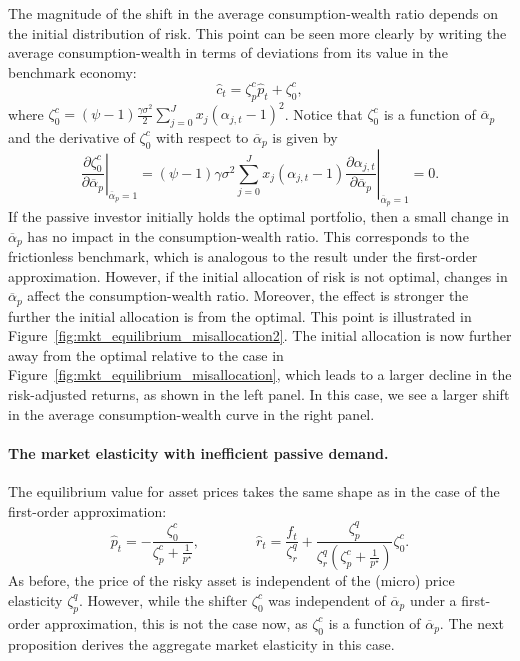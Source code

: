 The magnitude of the shift in the average consumption-wealth ratio depends on the initial distribution of risk. 
This point can be seen more clearly by writing the average consumption-wealth in terms of deviations from its value in the benchmark economy:
\begin{equation}
    \hat{c}_{t} = \zeta_{p}^c \hat{p}_t + \zeta_{0}^c,
\end{equation}
where $\zeta_0^c = (\psi-1) \frac{\gamma \sigma^2}{2} \sum_{j=0}^J x_j (\alpha_{j,t}-1)^2$. Notice that $\zeta_0^c$ is a function of $\overline{\alpha}_p$ and the derivative of $\zeta_0^c$ with respect to $\overline{\alpha}_p$ is given by
\begin{equation}
    \left. \frac{\partial \zeta_0^c}{\partial \overline{\alpha}_p} \right|_{\overline{\alpha}_p = 1} =  \left.(\psi-1) \gamma \sigma^2 \sum_{j=0}^J x_j (\alpha_{j,t}-1) \frac{\partial \alpha_{j,t}}{\partial \overline{\alpha}_p}\right|_{\overline{\alpha}_p = 1} = 0.
\end{equation}
If the passive investor initially holds the optimal portfolio, then a small change in $\overline{\alpha}_p$ has no impact in the consumption-wealth ratio. 
This corresponds to the frictionless benchmark, which is analogous to the result under the first-order approximation. 
However, if the initial allocation of risk is not optimal, changes in $\overline{\alpha}_p$ affect the consumption-wealth ratio. 
Moreover, the effect is stronger the further the initial allocation is from the optimal. 
This point is illustrated in Figure~\ref{fig:mkt_equilibrium_misallocation2}.
The initial allocation is now further away from the optimal relative to the case in Figure~\ref{fig:mkt_equilibrium_misallocation}, which leads to a larger decline in the risk-adjusted returns, as shown in the left panel. 
In this case, we see a larger shift in the average consumption-wealth curve in the right panel. 



\paragraph{The market elasticity with inefficient passive demand.} The equilibrium value for asset prices takes the same shape as in the case of the first-order approximation:
\begin{equation}
    \hat{p}_t = - \frac{\zeta_0^c}{\zeta_p^c + \frac{1}{p^\star} }, \qquad \qquad 
    \hat{r}_t = \frac{f_t}{\zeta_r^q} + \frac{\zeta_p^q}{\zeta_r^q \left( \zeta_p^c + \frac{1}{p^\star} \right)} \zeta_0^c.\nonumber
\end{equation}
As before, the price of the risky asset is independent of the (micro) price elasticity $\zeta_p^q$. However, while the shifter $\zeta_0^c$ was independent of $\overline{\alpha}_p$ under a first-order approximation, this is not the case now, as $\zeta_0^c$ is a function of $\overline{\alpha}_p$. The next proposition derives the aggregate market elasticity in this case.

